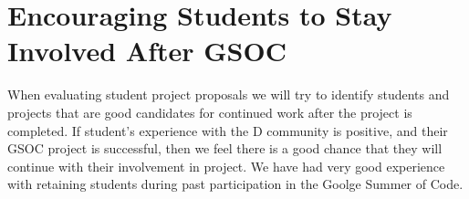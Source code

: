 \documentclass[	DIV=calc,%
							paper=a4,%
							fontsize=11pt,%
							twocolumn]{scrartcl}	 					%
\begin{document}
\section{Encouraging Students to Stay Involved After GSOC}


When evaluating student project proposals we will try to identify
students and projects that are good candidates for continued work
after the project is completed.  If student's experience with the 
D community is positive, and their GSOC project is successful, then
we feel there is a good chance that they will continue with their
involvement in project. We have had very good experience with retaining
students during past participation in the Goolge Summer of Code.     
\end{document}
